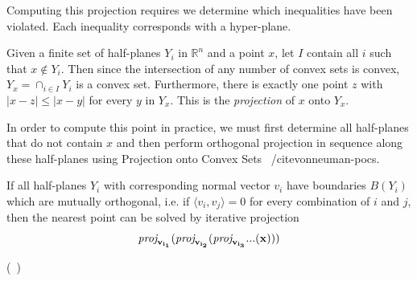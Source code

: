 Computing this projection requires we determine which inequalities
have been violated. Each inequality corresponds with a hyper-plane.
\begin{definition}
  Given a finite set of half-planes $Y_i$ in $\mathbb{R}^n$ and a point $x$,
  let $I$ contain all $i$ such that $x \notin Y_i$. Then since the
  intersection of any number of convex sets is convex, $Y_x = \cap_{i \in
    I} Y_i$ is a convex set. Furthermore, there is exactly one point
  $z$ with $|x - z| \leq |x - y|$ for every $y$ in $Y_x$. This is the
  \emph{projection} of $x$ onto $Y_x$.
\end{definition}

In order to compute this point in practice, we must first determine
all half-planes that do not contain $x$ and then perform orthogonal
projection in sequence along these half-planes using Projection onto
Convex Sets ~/cite{vonneuman-pocs}. 

\begin{lemma}
  If all half-planes $Y_i$ with corresponding normal vector $v_i$ have
  boundaries $B(Y_i)$ which are mutually orthogonal, i.e. if $\langle
  v_i, v_j\rangle = 0$ for every combination of $i$ and $j$, then
  the nearest point can be solved by iterative projection 
  \begin{align}
    \vectorproj[v_{i_1}]{(\vectorproj[v_{i_2}]{(\vectorproj[v_{i_3}]{...(x)})})}
  \end{align}
\end{lemma}
(~\cite{vonneuman-pocs})

